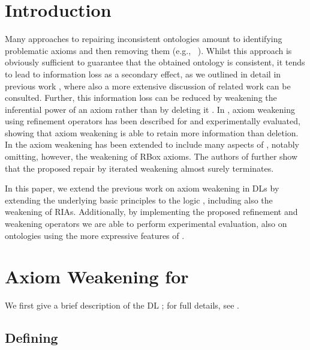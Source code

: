 \documentclass[
]{ceurart}
\begin{document}
\section{Introduction}

Many approaches to repairing inconsistent ontologies amount to identifying problematic axioms and then removing them (e.g., ~\cite{ScCo03,kalyanpur2005debugging,kalyanpur2006repairing,BaPS07}). Whilst this approach is obviously sufficient to guarantee that the obtained ontology is consistent, it tends to lead to information loss as a secondary effect, as we outlined in detail in previous work \cite{troquard2018repairing,confalonieri2020towards}, where also a more extensive discussion of related work can be consulted.   Further, this information loss can be reduced by weakening the inferential power of an axiom rather than by deleting it \cite{du2014practical,AMAI-2018,DBLP:conf/kr/BaaderKNP18,troquard2018repairing,confalonieri2020towards}. 
%
In \cite{troquard2018repairing}, axiom weakening using refinement operators has been described for \ALC and experimentally evaluated, showing that axiom weakening is able to retain more information than deletion. In \cite{confalonieri2020towards} the axiom weakening has been extended to include many aspects of \SROIQ, notably omitting, however, the weakening of RBox axioms. The authors of \cite{confalonieri2020towards} further show that the proposed repair by iterated weakening almost surely terminates. 

In this  paper, we extend the previous work on axiom weakening in DLs by extending the underlying basic principles to the logic \SROIQ, including also the weakening of RIAs. Additionally, by implementing the proposed refinement and weakening operators we are able to perform experimental evaluation, also on ontologies using the more expressive features of \SROIQ.

\section{Axiom Weakening for \SROIQ}

We first give a brief description of the DL \SROIQ; for full details, see \cite{baader_horrocks_lutz_sattler_2017,HorrocksKutzSattlerKR2006}. 

\subsection{Defining \SROIQ}
\end{document}
